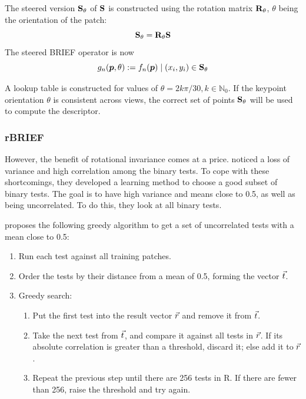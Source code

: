 The steered version $\mathbf{S}_\theta$ of $\mathbf{S}$ is constructed using the rotation matrix $\mathbf{R}_\theta$, $\theta$ being the orientation of the patch:
\begin{equation}
    \mathbf{S}_\theta = \mathbf{R}_\theta \mathbf{S}
\end{equation}
The steered BRIEF operator is now
\begin{equation}
    g_n(\boldsymbol{p},\theta):=f_n(\boldsymbol{p})\mid(x_i,y_i)\in \mathbf{S}_\theta
\end{equation}

A lookup table is constructed for values of $\theta = 2k\pi/30, k \in \mathbb{N}_0$. If the keypoint orientation $\theta$ is consistent across views, the correct set of points $\mathbf{S}_\theta$ will be used to compute the descriptor.

\subsubsection{rBRIEF}
However, the benefit of rotational invariance comes at a price. \cite{6126544} noticed a loss of variance and high correlation among the binary tests. To cope with these shortcomings, they developed a learning method to choose a good subset of binary tests. The goal is to have high variance and means close to 0.5, as well as being uncorrelated. To do this, they look at all binary tests.\bigskip

\cite{6126544} proposes the following greedy algorithm to get a set of uncorrelated tests with a mean close to 0.5:
\begin{enumerate}
    \item Run each test  against all training patches.\smallskip
    \item Order the tests by their distance from a mean of 0.5, forming the vector $\vec t$.\smallskip
    \item Greedy search:\smallskip
    \begin{enumerate}
        \item Put the first test into the result vector $\vec r$ and remove it from $\vec t$.\smallskip
        \item Take the next test from $\vec t$, and compare it against all tests in $\vec r$. If its absolute correlation is greater than a threshold, discard it; else add it to $\vec r$.\smallskip
        \item Repeat the previous step until there are 256 tests in R. If there are fewer than 256, raise the threshold and try again.\smallskip
    \end{enumerate}
\end{enumerate}

